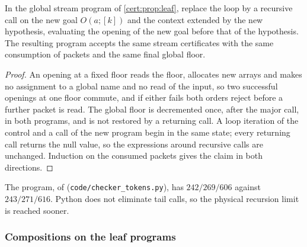 \begin{proposition}\label{cert:prop:tail}
In the global stream program of \cref{cert:prop:leaf}, replace the loop by
a recursive call on the new goal $O(a;[k])$ and the context extended by the new
hypothesis, evaluating the opening of the new goal before that of the
hypothesis. The resulting program accepts the same stream certificates with
the same consumption of packets and the same final global floor.
\end{proposition}
\begin{proof}
An opening at a fixed floor reads the floor, allocates new arrays and makes
no assignment to a global name and no read of the input, so two successful
openings at one floor commute, and if either fails both orders reject before a
further packet is read. The global floor is decremented once, after the major
call, in both programs, and is not restored by a returning call. A loop
iteration of the control and a call of the new program begin in the same
state; every returning call returns the null value, so the expressions around
recursive calls are unchanged. Induction on the consumed packets gives the
claim in both directions.
\end{proof}

The program, of  (\texttt{code/checker\_tokens.py}),
has $242/269/606$ against $243/271/616$. Python does not eliminate tail calls,
so the physical recursion limit is reached sooner.

\subsubsection*{Compositions on the leaf programs}

